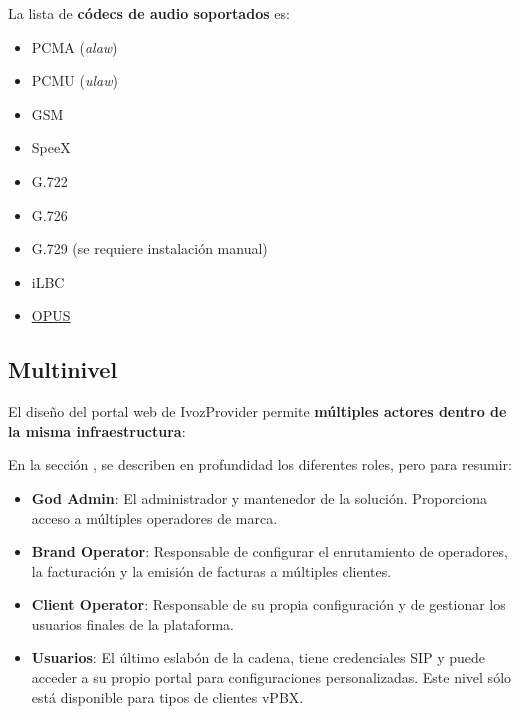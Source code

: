 \documentclass[letterpaper,10pt,spanish]{sphinxmanual}
\begin{document}
La lista de \textbf{códecs de audio soportados} es:
\begin{itemize}
\item {} 
PCMA (\emph{alaw})

\item {} 
PCMU (\emph{ulaw})

\item {} 
GSM

\item {} 
SpeeX

\item {} 
G.722

\item {} 
G.726

\item {} 
G.729 (se requiere instalación manual)

\item {} 
iLBC

\item {} 
\href{http://opus-codec.org/}{OPUS}

\end{itemize}


\subsection{Multinivel}
\label{basic_concepts/intro/what_is_ivozprovider:multilevel}\label{basic_concepts/intro/what_is_ivozprovider:id1}
El diseño del portal web de IvozProvider permite \textbf{múltiples actores dentro de la misma infraestructura}:

\noindent{}

En la sección {\hyperref[basic_concepts/operation_roles/index:operation\string-roles]{}}, se describen en profundidad los diferentes roles, pero para resumir:
\begin{itemize}
\item {} 
\textbf{God Admin}: El administrador y mantenedor de la solución. Proporciona acceso a múltiples operadores de marca.

\item {} 
\textbf{Brand Operator}: Responsable de configurar el enrutamiento de operadores, la facturación y la emisión de facturas a múltiples clientes.

\item {} 
\textbf{Client Operator}: Responsable de su propia configuración y de gestionar los usuarios finales de la plataforma.

\item {} 
\textbf{Usuarios}: El último eslabón de la cadena, tiene credenciales SIP y puede acceder a su propio portal para configuraciones personalizadas. Este nivel sólo está disponible para tipos de clientes vPBX.

\end{itemize}
\end{document}
